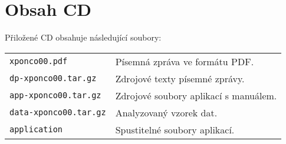 \chapter{Obsah CD}

Přiložené CD obsahuje následující soubory:
\medskip

\begin{tabular} {l l}
\texttt{xponco00.pdf} & Písemná zpráva ve formátu PDF.\\
\texttt{dp-xponco00.tar.gz} & Zdrojové texty písemné zprávy.\\
\texttt{app-xponco00.tar.gz} & Zdrojové soubory aplikací s manuálem.\\
\texttt{data-xponco00.tar.gz} & Analyzovaný vzorek dat.\\
\texttt{application} & Spustitelné soubory aplikací.\\

\end{tabular}




